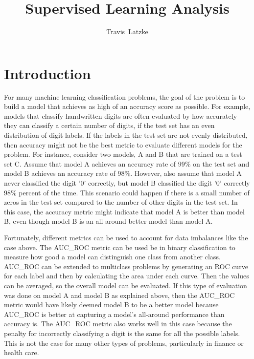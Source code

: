 \documentclass[10pt,journal,compsoc]{IEEEtran}
\begin{document}
\title{Supervised Learning Analysis}




\author{Travis~Latzke}



\maketitle


\IEEEdisplaynontitleabstractindextext

\IEEEpeerreviewmaketitle


\ifCLASSOPTIONcompsoc
{}
\else
\section{Introduction}
\label{sec:introduction}
\fi


\IEEEPARstart 
For many machine learning classification problems, the goal of the problem is to build a model that achieves as high of an accuracy score as possible. For example, models that classify handwritten digits are often evaluated by how accurately they can classify a certain number of digits, if the test set has an even distribution of digit labels. If the labels in the test set are not evenly distributed, then accuracy might not be the best metric to evaluate different models for the problem. For instance, consider two models, A and B that are trained on a test set C. Assume that model A achieves an accuracy rate of 99\% on the test set and model B achieves an accuracy rate of 98\%. However, also assume that model A never classified the digit '0' correctly, but model B classified the digit '0' correctly 98\% percent of the time. This scenario could happen if there is a small number of zeros in the test set compared to the number of other digits in the test set. In this case, the accuracy metric might indicate that model A is better than model B, even though model B is an all-around better model than model A.

Fortunately, different metrics can be used to account for data imbalances like the case above. The AUC\_ROC metric can be used be in binary classification to measure how good a model can distinguish one class from another class. AUC\_ROC can be extended to multiclass problems by generating an ROC curve for each label and then by calculating the area under each curve. Then the values can be averaged, so the overall model can be evaluated. If this type of evaluation was done on model A and model B as explained above, then the AUC\_ROC metric would have likely deemed model B to be a better model because AUC\_ROC is better at capturing a model’s all-around performance than accuracy is. The AUC\_ROC metric also works well in this case because the penalty for incorrectly classifying a digit is the same for all the possible labels. This is not the case for many other types of problems, particularly in finance or health care.
\end{document}
